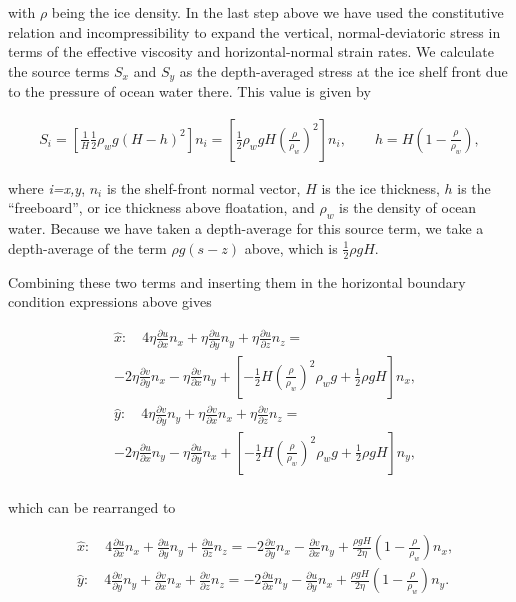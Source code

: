 with \textit{\(\rho{}\)} being the ice density. In the last step above we have used the constitutive relation and incompressibility to expand the vertical, normal-deviatoric stress in terms of the effective viscosity and horizontal-normal strain rates. We calculate the source terms $S_x$ and $S_y$ as the depth-averaged stress at the ice shelf front due to the pressure of ocean water there. This value is given by

\begin{align*}
S_{i}=\left[ \frac{1}{H}\frac{1}{2}\rho _{w}g\left( H-h \right)^{2} \right]n_{i}=\left[ \frac{1}{2}\rho _{w}gH\left( \frac{\rho }{\rho _{w}} \right)^{2} \right]n_{i},\quad \quad h=H\left( 1-\frac{\rho _{{}}}{\rho _{w}} \right),
\end{align*}

where  \textit{i=x,y}, $n_i$ is the shelf-front normal vector, $H$ is the ice thickness, $h$ is the ``freeboard'', or ice thickness above floatation, and $\rho_w$ is the density of ocean water. Because we have taken a depth-average for this source term, we take a depth-average of the term $\rho g\left( s-z \right)$ above, which is $\frac{1}{2}\rho gH$.

Combining these two terms and inserting them in the horizontal boundary condition expressions above gives

\begin{align*}
& \hat{x}:\quad 4\eta \frac{\partial u}{\partial x}n_{x}+\eta \frac{\partial u}{\partial y}n_{y}+\eta \frac{\partial u}{\partial z}n_{z}= \\
& -2\eta \frac{\partial v}{\partial y}n_{x}-\eta \frac{\partial v}{\partial x}n_{y}+\left[ -\frac{1}{2}H\left( \frac{\rho }{\rho _{w}} \right)^{2}\rho _{w}g+\frac{1}{2}\rho gH \right]n_{x}, \\ 
 & \hat{y}:\quad 4\eta \frac{\partial v}{\partial y}n_{y}+\eta \frac{\partial v}{\partial x}n_{x}+\eta \frac{\partial v}{\partial z}n_{z}= \\
 & -2\eta \frac{\partial u}{\partial x}n_{y}-\eta \frac{\partial u}{\partial y}n_{x}+\left[ -\frac{1}{2}H\left( \frac{\rho }{\rho _{w}} \right)^{2}\rho _{w}g+\frac{1}{2}\rho gH \right]n_{y}, \\ 
\end{align*}

which can be rearranged to

\begin{align*}
  & \hat{x}:\quad 4\frac{\partial u}{\partial x}n_{x}+\frac{\partial u}{\partial y}n_{y}+\frac{\partial u}{\partial z}n_{z}=-2\frac{\partial v}{\partial y}n_{x}-\frac{\partial v}{\partial x}n_{y}+\frac{\rho gH}{2\eta }\left( 1-\frac{\rho }{\rho _{w}} \right)n_{x}, \\ 
 & \hat{y}:\quad 4\frac{\partial v}{\partial y}n_{y}+\frac{\partial v}{\partial x}n_{x}+\frac{\partial v}{\partial z}n_{z}=-2\frac{\partial u}{\partial x}n_{y}-\frac{\partial u}{\partial y}n_{x}+\frac{\rho gH}{2\eta }\left( 1-\frac{\rho }{\rho _{w}} \right)n_{y}. \\ 
\end{align*}

